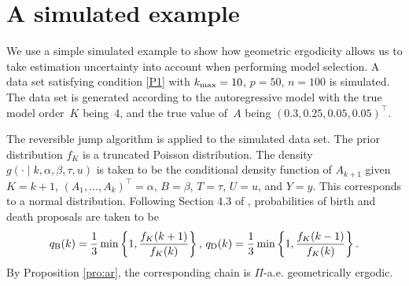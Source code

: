 \documentclass[12pt]{article}
\begin{document}
	\section{A simulated example} \label{sssec:robustsimulate}
	
	We use a simple simulated example to show how geometric ergodicity allows us to take estimation uncertainty into account when performing model selection.
	A data set satisfying condition \ref{P1} with $k_{\scriptsize \mbox{max}} = 10$, $p = 50$, $n = 100$ is simulated.
	The data set is generated according to the autoregressive model with the true model order~$K$ being~4, and the true value of~$A$ being $(0.3, 0.25, 0.05, 0.05)^{\top}$.
	
	The reversible jump algorithm is applied to the simulated data set.
	The prior distribution $f_K$ is a truncated Poisson distribution.
	The density $g(\cdot \mid k, \alpha, \beta, \tau, u)$ is taken to be the conditional density function of $A_{k+1}$ given $K=k+1$, $(A_1, \dots, A_k)^{\top} = \alpha$, $B = \beta$, $T = \tau$, $U = u$, and $Y = y$.
	This corresponds to a normal distribution.
	Following Section 4.3 of \cite{green1995reversible}, probabilities of birth and death proposals are taken to be
	\[
	q_{\scriptsize\mbox{B}}(k) = \frac{1}{3} \min \left\{ 1, \frac{f_K(k+1)}{f_K(k)} \right\}, \, q_{\scriptsize\mbox{D}}(k) = \frac{1}{3} \min \left\{ 1, \frac{f_K(k-1)}{f_K(k)} \right\}.
	\]
	By Proposition \ref{pro:ar}, the corresponding chain is $\Pi$-a.e. geometrically ergodic.
	
	
	
\end{document}
